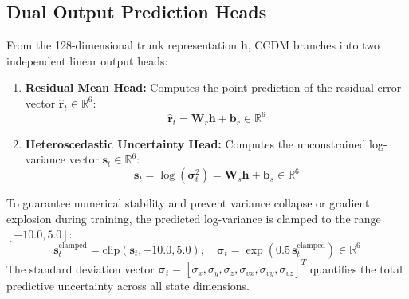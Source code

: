 \documentclass[10pt,a4paper]{article}
\begin{document}
\subsection{Dual Output Prediction Heads}
From the 128-dimensional trunk representation $\mathbf{h}$, CCDM branches into two independent linear output heads:
\begin{enumerate}
    \item \textbf{Residual Mean Head:} Computes the point prediction of the residual error vector $\hat{\mathbf{r}}_t \in \mathbb{R}^6$:
    \begin{equation}
    \hat{\mathbf{r}}_t = \mathbf{W}_r \mathbf{h} + \mathbf{b}_r \in \mathbb{R}^6
    \label{eq:mean_head}
    \end{equation}
    \item \textbf{Heteroscedastic Uncertainty Head:} Computes the unconstrained log-variance vector $\mathbf{s}_t \in \mathbb{R}^6$:
    \begin{equation}
    \mathbf{s}_t = \log \left(\bm{\sigma}_t^2\right) = \mathbf{W}_s \mathbf{h} + \mathbf{b}_s \in \mathbb{R}^6
    \label{eq:var_head}
    \end{equation}
\end{enumerate}
To guarantee numerical stability and prevent variance collapse or gradient explosion during training, the predicted log-variance is clamped to the range $[-10.0, 5.0]$:
\begin{equation}
\mathbf{s}_t^{\mathrm{clamped}} = \mathrm{clip}(\mathbf{s}_t, -10.0, 5.0), \quad \bm{\sigma}_t = \exp\left(0.5 \, \mathbf{s}_t^{\mathrm{clamped}}\right) \in \mathbb{R}^6
\label{eq:clamped_sigma}
\end{equation}
The standard deviation vector $\bm{\sigma}_t = [\sigma_x, \sigma_y, \sigma_z, \sigma_{vx}, \sigma_{vy}, \sigma_{vz}]^T$ quantifies the total predictive uncertainty across all state dimensions.

\newpage

\end{document}
